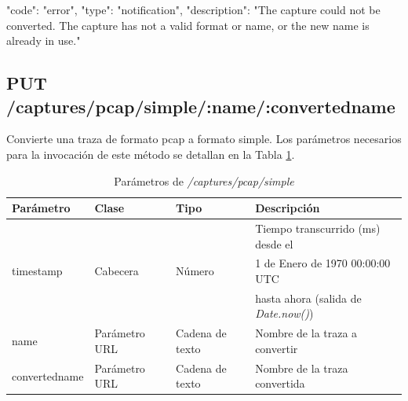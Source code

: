 \begin{itemize}
{\begin{minipage}{\textwidth}
\begin{code}[language=json]
{
  "code": "error",
  "type": "notification",
  "description": "The capture could not be converted. The capture has not a valid format or name, or the new name is already in use."
}
\end{code}
\end{minipage}
}
\end{itemize}

%
%
\subsection{PUT /captures/pcap/simple/:name/:convertedname}
Convierte una \gls{traza} de formato \gls{pcap} a formato \gls{simple}. Los parámetros necesarios para la invocación de este método se detallan en la Tabla \ref{extra:api:capturespcapsimple:invocacion}.

\begin{table}[H]
\centering
\begin{tabular}{|l|l|l|l|}
\hline
\rowcolor[HTML]{F5F5F5}
\textbf{Parámetro}  & \textbf{Clase} & \textbf{Tipo}   & \textbf{Descripción}                        \\ \hline
                    &                &                 & Tiempo transcurrido (ms) desde el           \\
timestamp           & Cabecera       & Número          & 1 de Enero de 1970 00:00:00 UTC             \\
                    &                &                 & hasta ahora (salida de \textit{Date.now()}) \\ \hline
name                & Parámetro URL  & Cadena de texto & Nombre de la \gls{traza} a convertir        \\ \hline
convertedname       & Parámetro URL  & Cadena de texto & Nombre de la \gls{traza} convertida         \\ \hline
\end{tabular}
\caption{Parámetros de \textit{/captures/pcap/simple}}
\label{extra:api:capturespcapsimple:invocacion}
\end{table}

